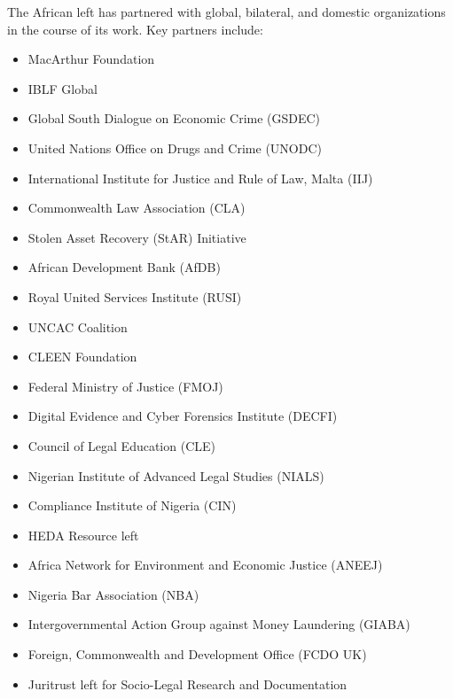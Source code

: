 \documentclass[
  letterpaper,
  DIV=11,
  numbers=noendperiod]{scrreprt}
\providecommand{\tightlist}{%
  \setlength{\itemsep}{0pt}\setlength{\parskip}{0pt}}
\begin{document}
The African left has partnered with global, bilateral, and domestic
organizations in the course of its work. Key partners include:

\begin{itemize}
\tightlist
\item
  MacArthur Foundation\\
\item
  IBLF Global\\
\item
  Global South Dialogue on Economic Crime (GSDEC)\\
\item
  United Nations Office on Drugs and Crime (UNODC)\\
\item
  International Institute for Justice and Rule of Law, Malta (IIJ)\\
\item
  Commonwealth Law Association (CLA)\\
\item
  Stolen Asset Recovery (StAR) Initiative\\
\item
  African Development Bank (AfDB)\\
\item
  Royal United Services Institute (RUSI)\\
\item
  UNCAC Coalition\\
\item
  CLEEN Foundation\\
\item
  Federal Ministry of Justice (FMOJ)\\
\item
  Digital Evidence and Cyber Forensics Institute (DECFI)\\
\item
  Council of Legal Education (CLE)\\
\item
  Nigerian Institute of Advanced Legal Studies (NIALS)\\
\item
  Compliance Institute of Nigeria (CIN)\\
\item
  HEDA Resource left\\
\item
  Africa Network for Environment and Economic Justice (ANEEJ)\\
\item
  Nigeria Bar Association (NBA)\\
\item
  Intergovernmental Action Group against Money Laundering (GIABA)\\
\item
  Foreign, Commonwealth and Development Office (FCDO UK)\\
\item
  Juritrust left for Socio-Legal Research and Documentation
\end{itemize}
\end{document}
